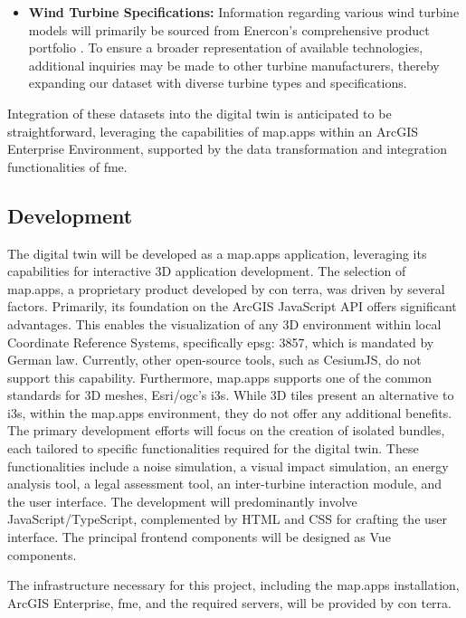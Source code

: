 \documentclass[11pt, titlepage, a4paper]{scrartcl}
\begin{document}
\begin{linenumbers}
\begin{itemize}
        \item \textbf{Wind Turbine Specifications:} Information regarding various wind turbine models will primarily be sourced from Enercon’s comprehensive product portfolio \cite{enerconglobalgmbhENERCONWindenergieanlagenPortfolio}. To ensure a broader representation of available technologies, additional inquiries may be made to other turbine manufacturers, thereby expanding our dataset with diverse turbine types and specifications.
    \end{itemize}

    Integration of these datasets into the digital twin is anticipated to be straightforward, leveraging the capabilities of map.apps within an ArcGIS Enterprise Environment, supported by the data transformation and integration functionalities of \gls{fme}.




    \subsection{Development}
    The digital twin will be developed as a map.apps application, leveraging its capabilities for interactive 3D application development. The selection of map.apps, a proprietary product developed by con terra, was driven by several factors. Primarily, its foundation on the ArcGIS JavaScript API offers significant advantages. This  enables the visualization of any 3D environment within local Coordinate Reference Systems, specifically \gls{epsg}: 3857, which is mandated by German law. Currently, other open-source tools, such as CesiumJS, do not support this capability. Furthermore, map.apps supports one of the common standards for 3D meshes, Esri/\gls{ogc}'s \gls{i3s}. While 3D tiles present an alternative to \gls{i3s}, within the map.apps environment, they do not offer any additional benefits. The primary development efforts will focus on the creation of isolated bundles, each tailored to specific functionalities required for the digital twin. These functionalities include a noise simulation, a visual impact simulation, an energy analysis tool, a legal assessment tool, an inter-turbine interaction module, and the user interface. The development will predominantly involve JavaScript/TypeScript, complemented by HTML and CSS for crafting the user interface. The principal frontend components will be designed as Vue components.

    The infrastructure necessary for this project, including the map.apps installation, ArcGIS Enterprise, \gls{fme}, and the required servers, will be provided by con terra.


\end{linenumbers}
\end{document}
